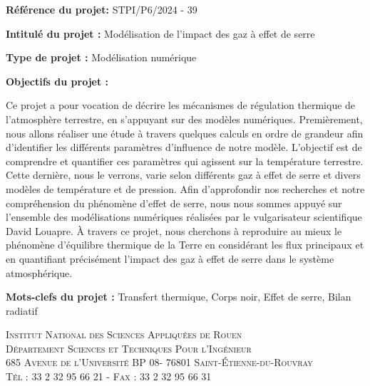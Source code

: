 \documentclass[a4paper, 12pt]{report} %
\begin{document}
\textbf{Référence du projet:} STPI/P6/2024 - 39 \vspace{\baselineskip}

\textbf{Intitulé du projet :} Modélisation de l'impact des gaz à effet de serre \vspace{\baselineskip}

\textbf{Type de projet :} Modélisation numérique \vspace{\baselineskip}

\textbf{Objectifs du projet :} \vspace{\baselineskip} 

\indent Ce projet a pour vocation de 
décrire les mécanismes de régulation thermique de 
l'atmosphère terrestre, en s'appuyant sur des modèles numériques.
Premièrement, nous allons réaliser
une étude à travers quelques calculs en ordre de grandeur afin
d'identifier les différents paramètres d'influence de notre modèle.
L'objectif est de comprendre et quantifier ces paramètres qui agissent sur la température terrestre. Cette dernière, nous le verrons, varie selon différents gaz à effet de serre 
et divers modèles de température et de pression. 
Afin d'approfondir nos recherches et notre compréhension du phénomène d'effet de serre, nous nous sommes appuyé sur l'ensemble des modélisations numériques réalisées par le vulgarisateur scientifique David Louapre. À travers ce projet, 
nous cherchons à reproduire au mieux le 
phénomène d'équilibre thermique de la Terre en considérant 
les flux principaux et en quantifiant précisément l'impact
des gaz à effet de serre dans le système atmosphérique. \vspace{\baselineskip}

\textbf{Mots-clefs du projet :} Transfert thermique, Corps noir, Effet de serre, Bilan radiatif 
\vspace{\baselineskip} 

\vfill


\begin{center}
	\scshape Institut National des Sciences Appliquées de Rouen \\
	Département Sciences et Techniques Pour l'Ingénieur \\
	685 Avenue de l'Université BP 08- 76801 Saint-Étienne-du-Rouvray \\ Tél : 33 2 32 95 66 21 - Fax : 33 2 32 95 66 31
\end{center}

\end{document}
